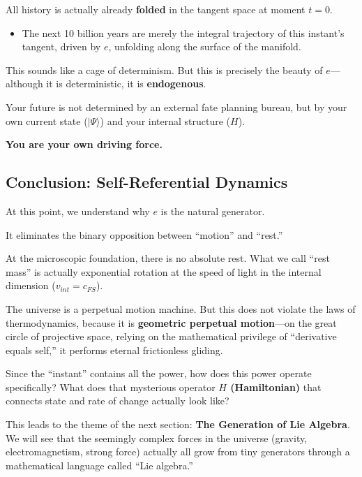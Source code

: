 All history is actually already \textbf{folded} in the tangent space at moment $t=0$.

\begin{itemize}
\item The next 10 billion years are merely the integral trajectory of this instant's tangent, driven by $e$, unfolding along the surface of the manifold.
\end{itemize}

This sounds like a cage of determinism. But this is precisely the beauty of \textbf{$e$}---although it is deterministic, it is \textbf{endogenous}.

Your future is not determined by an external fate planning bureau, but by your own current state ($|\Psi\rangle$) and your internal structure ($H$).

\textbf{You are your own driving force.}

\subsection{Conclusion: Self-Referential Dynamics}

At this point, we understand why $e$ is the natural generator.

It eliminates the binary opposition between ``motion'' and ``rest.''

At the microscopic foundation, there is no absolute rest. What we call ``rest mass'' is actually exponential rotation at the speed of light in the internal dimension ($v_{int} = c_{FS}$).

The universe is a perpetual motion machine. But this does not violate the laws of thermodynamics, because it is \textbf{geometric perpetual motion}---on the great circle of projective space, relying on the mathematical privilege of ``derivative equals self,'' it performs eternal frictionless gliding.

Since the ``instant'' contains all the power, how does this power operate specifically? What does that mysterious operator \textbf{$H$ (Hamiltonian)} that connects state and rate of change actually look like?

This leads to the theme of the next section: \textbf{The Generation of Lie Algebra}. We will see that the seemingly complex forces in the universe (gravity, electromagnetism, strong force) actually all grow from tiny generators through a mathematical language called ``Lie algebra.''

